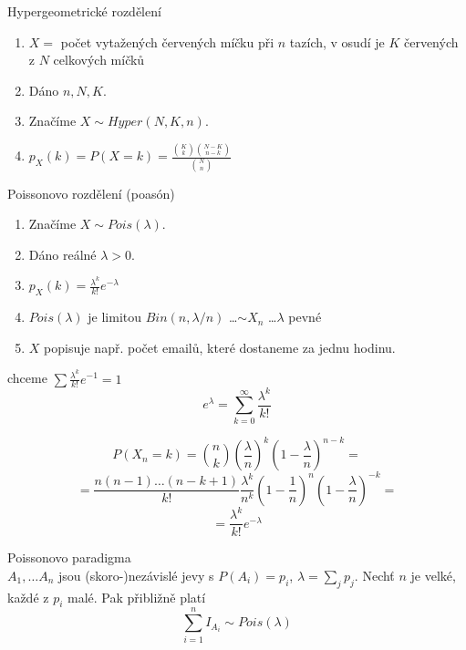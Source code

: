 \documentclass[../main.tex]{subfiles}
\begin{document}
\begin{definition}
    Hypergeometrické rozdělení\\

    \begin{enumerate}
        \item $X = $ počet vytažených červených míčku při $n$ tazích, v osudí je 
        $K$ červených z $N$ celkových míčků
        \item Dáno $n,N,K$.
        \item Značíme $X \sim Hyper(N,K,n)$.
        \item $p_X(k) = P(X = k) = \frac{\binom{K}{k}\binom{N-K}{n-k}}{\binom{N}{n}}$
    \end{enumerate}
\end{definition}

\begin{definition}
    Poissonovo rozdělení (poasón)\\

    \begin{enumerate}
        \item Značíme $X \sim Pois(\lambda)$.
        \item Dáno reálné $\lambda > 0$.
        \item $p_X(k) = \frac{\lambda^k}{k!}e^{-\lambda}$
        \item $Pois(\lambda)$ je limitou $Bin(n,\lambda/n)$ \dots $\sim X_n$ \dots $\lambda$ pevné
        \item $X$ popisuje např. počet emailů, které dostaneme za jednu hodinu.
    \end{enumerate}

    chceme $\sum \frac{\lambda^k}{k!}e^{-1} = 1$
    \[e^\lambda =  \sum^\infty_{k=0} \frac{\lambda^k}{k!}\]

    \[P(X_n = k) = \binom{n}{k}\left(\frac{\lambda}{n}\right)^k\left(1-\frac{\lambda}{n}\right)^{n-k} =\]
    \[=\frac{n(n-1)\dots (n-k+1)}{k!} \frac{\lambda^k}{n^k} \left(1-\frac{1}{n}\right)^n \left(1-\frac{\lambda}{n}\right)^{-k}=\]
    \[ = \frac{\lambda^k}{k!}e^{-\lambda}\]
\end{definition}

\begin{remark}
    Poissonovo paradigma\\

    $A_1,\dots A_n$ jsou (skoro-)nezávislé jevy s $P(A_i) = p_i$,
    $\lambda = \sum_j p_j$. Nechť $n$ je velké, každé z $p_i$ malé. Pak přibližně platí
    \[\sum^n_{i=1}I_{A_i} \sim Pois(\lambda)\]
\end{remark}
\end{document}
